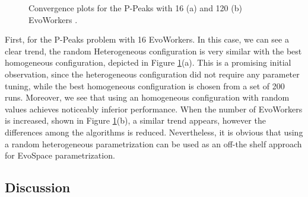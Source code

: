 \begin{figure}[!ht]
    \centering
    \caption{Convergence plots for the P-Peaks with 16 (a) and 120 (b) EvoWorkers .}
    \label{fig:PPeaks}
\end{figure}



First, for the P-Peaks problem with 16 EvoWorkers.
In this case, we can see a clear trend, the random Heterogeneous configuration is very similar with the best homogeneous configuration,
depicted in Figure \ref{fig:PPeaks}(a).
This is a promising initial observation, since the heterogeneous configuration did not require any parameter tuning, while the best homogeneous configuration
is chosen from a set of 200 runs.
Moreover, we see that using an homogeneous configuration with random values achieves noticeably inferior performance.
When the number of EvoWorkers is increased, shown in Figure \ref{fig:PPeaks}(b), a similar trend appears,
however the differences among the algorithms is reduced.
Nevertheless, it is obvious that using a random heterogeneous parametrization can be used as an off-the shelf approach for EvoSpace parametrization.



\subsection{Discussion}


